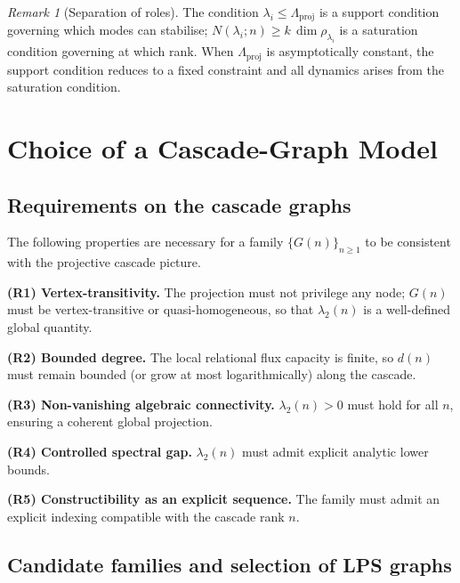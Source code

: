 \documentclass[12pt, a4paper]{article}
\theoremstyle{plain}
\theoremstyle{definition}
\theoremstyle{remark}
\newtheorem{remark}{Remark}[section]
\begin{document}
      \begin{remark}[Separation of roles]
  The condition $\lambda_i \leq \Lambda_{\mathrm{proj}}$ is a support condition
  governing which modes can stabilise; $N(\lambda_i; n) \geq k\,\dim\rho_{\lambda_i}$
  is a saturation condition governing at which rank.
  When $\Lambda_{\mathrm{proj}}$ is asymptotically constant, the support
  condition reduces to a fixed constraint and all dynamics arises from the
  saturation condition.
      \end{remark}
  \section{Choice of a Cascade-Graph Model}
    \label{sec:model}

    \subsection{Requirements on the cascade graphs}
      \label{sec:model:requirements}

      The following properties are necessary for a family $\{G(n)\}_{n \geq 1}$ to
      be consistent with the projective cascade picture.

      \medskip
      \noindent\textbf{(R1) Vertex-transitivity.}
      The projection must not privilege any node; $G(n)$ must be vertex-transitive
      or quasi-homogeneous, so that $\lambda_2(n)$ is a well-defined global quantity.

      \medskip
      \noindent\textbf{(R2) Bounded degree.}
      The local relational flux capacity is finite, so $d(n)$ must remain bounded
      (or grow at most logarithmically) along the cascade.

      \medskip
      \noindent\textbf{(R3) Non-vanishing algebraic connectivity.}
      $\lambda_2(n) > 0$ must hold for all $n$, ensuring a coherent global
      projection.

      \medskip
      \noindent\textbf{(R4) Controlled spectral gap.}
      $\lambda_2(n)$ must admit explicit analytic lower bounds.

      \medskip
      \noindent\textbf{(R5) Constructibility as an explicit sequence.}
      The family must admit an explicit indexing compatible with the cascade rank $n$.

    \subsection{Candidate families and selection of LPS graphs}
      \label{sec:model:candidates}
\end{document}
